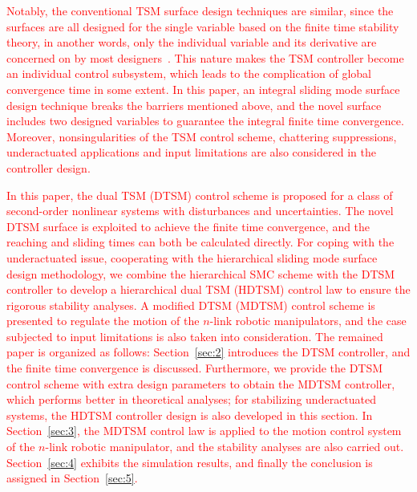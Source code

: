 \documentclass[3p]{elsarticle}
\theoremstyle{plain}
\theoremstyle{remark}
\begin{document}
\textcolor{red}{Notably, the conventional TSM surface design techniques are similar, since the surfaces are all designed for the single variable based on the finite time stability theory, in another words, only the individual variable and its derivative are concerned on by most designers~\cite{mu2016switching}. This nature makes the TSM controller become an individual control subsystem, which leads to the complication of global convergence time in some extent. In this paper, an integral sliding mode  surface design technique breaks the barriers mentioned above, and the novel surface includes two designed variables to guarantee the integral finite time convergence. Moreover, nonsingularities of the TSM control scheme, chattering suppressions, underactuated applications and input limitations are also considered in the controller design.}

\textcolor{red}{In this paper, the dual TSM (DTSM) control scheme is proposed for a class of second-order nonlinear systems with disturbances and uncertainties. The novel DTSM surface is exploited to achieve the finite time convergence, and the reaching and sliding times can both be calculated directly. For coping with the underactuated issue, cooperating with the hierarchical sliding mode  surface design methodology, we combine the hierarchical SMC scheme with the DTSM controller to develop a hierarchical dual TSM (HDTSM) control law to ensure the rigorous stability analyses. A modified DTSM (MDTSM) control scheme is presented to regulate the motion of the $n$-link robotic manipulators, and the case subjected to input limitations is also taken into consideration. The remained paper is organized as follows: Section~\ref{sec:2} introduces the DTSM controller, and the finite time convergence is discussed. Furthermore, we provide the DTSM control scheme with extra design parameters to obtain the MDTSM controller, which performs better in theoretical analyses; for stabilizing underactuated systems, the HDTSM controller design is also developed in this section. In Section~\ref{sec:3}, the MDTSM control law is applied to the motion control system of the $n$-link robotic  manipulator, and the stability analyses are also carried out. Section~\ref{sec:4} exhibits the simulation results, and finally the conclusion is assigned in Section~\ref{sec:5}.}
\end{document}
